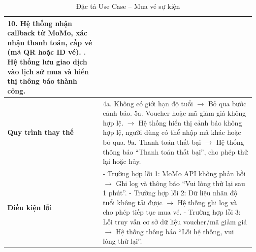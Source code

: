 \begin{table}[H]
\begin{tabularx}{\textwidth}{|l|X|}
10. Hệ thống nhận callback từ MoMo, xác nhận thanh toán, cấp vé (mã QR hoặc ID vé). \newline
11. Hệ thống lưu giao dịch vào lịch sử mua và hiển thị thông báo thành công. \\ \hline
\textbf{Quy trình thay thế} &
4a. Không có giới hạn độ tuổi $\rightarrow$ Bỏ qua bước cảnh báo. \newline
5a. Voucher hoặc mã giảm giá không hợp lệ.
$\rightarrow$ Hệ thống hiển thị cảnh báo không hợp lệ, người dùng có thể nhập mã khác hoặc bỏ qua. \newline
9a. Thanh toán thất bại $\rightarrow$ Hệ thống thông báo “Thanh toán thất bại”, cho phép thử lại hoặc hủy. \\ \hline
\textbf{Điều kiện lỗi} &
- Trường hợp lỗi 1: MoMo API không phản hồi $\rightarrow$ Ghi log và thông báo “Vui lòng thử lại sau 1 phút”. \newline
- Trường hợp lỗi 2: Dữ liệu nhãn độ tuổi không tải được $\rightarrow$ Hệ thống ghi log và cho phép tiếp tục mua vé. \newline
- Trường hợp lỗi 3: Lỗi truy vấn cơ sở dữ liệu voucher/mã giảm giá $\rightarrow$ Hệ thống thông báo “Lỗi hệ thống, vui lòng thử lại”. \\ \hline
\end{tabularx}
\vspace{15pt}
\caption{Đặc tả Use Case -- Mua vé sự kiện}
\label{tab:uc_ticket_purchase}
\end{table}

